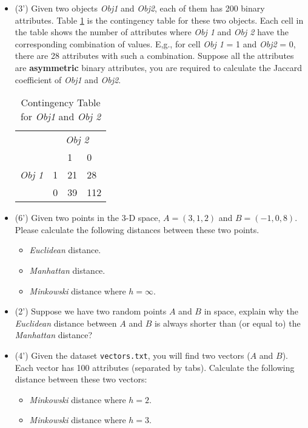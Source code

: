  \begin{itemize}
 \item[a.](3') Given two objects \textit{Obj1} and \textit{Obj2}, each of them has 200 binary attributes. Table \ref{contin} is the contingency table for these two objects. Each cell in the table shows the number of attributes where \textit{Obj 1} and \textit{Obj 2} have the corresponding combination of values. E,g., for cell \textit{Obj 1} = 1 and \textit{Obj2} = 0, there are 28 attributes with such a combination. Suppose  all the attributes are \textbf{asymmetric} binary attributes, you are required to calculate the Jaccard coefficient of \textit{Obj1} and \textit{Obj2}.

\begin{table}[h]
\centering

\begin{tabular}{llll}
                                                  & \multicolumn{3}{c}{{\it Obj 2}}                                             \\ \cline{2-4} 
\multicolumn{1}{l|}{\multirow{3}{*}{{\it Obj 1}}} & \multicolumn{1}{l|}{}  & \multicolumn{1}{l|}{1}  & \multicolumn{1}{l|}{0}   \\ \cline{2-4} 
\multicolumn{1}{l|}{}                             & \multicolumn{1}{l|}{1} & \multicolumn{1}{l|}{21} & \multicolumn{1}{l|}{28}  \\ \cline{2-4} 
\multicolumn{1}{l|}{}                             & \multicolumn{1}{l|}{0} & \multicolumn{1}{l|}{39} & \multicolumn{1}{l|}{112} \\ \cline{2-4} 
\end{tabular}
\caption{Contingency Table for \textit{Obj1} and \textit{Obj 2}}
\label{contin}
\end{table}


\item[b.](6') Given two points in the 3-D space, $A = (3,1,2)$ and $B = (-1,0,8)$. Please calculate the following distances between these two points.
 \begin{itemize}
 \item[1.] \textit{Euclidean} distance.
 \item[2.] \textit{Manhattan} distance.
 \item[3.]\textit{Minkowski} distance where $h = \infty$.
 \end{itemize} 
 \item[c.] (2') Suppose we have two random points $A$ and $B$ in space, explain why the \textit{Euclidean} distance between $A$ and $B$ is always shorter than (or equal to) the \textit{Manhattan} distance?
 \item[d.] (4') Given the dataset \texttt{vectors.txt}, you will find two vectors ($A$ and $B$). Each vector has 100 attributes (separated by tabs). Calculate the following distance between these two vectors:
  \begin{itemize}
  \item[1.] \textit{Minkowski} distance where $h = 2$.
  \item[2.] \textit{Minkowski} distance where $h = 3$.
  \end{itemize}
 \end{itemize}